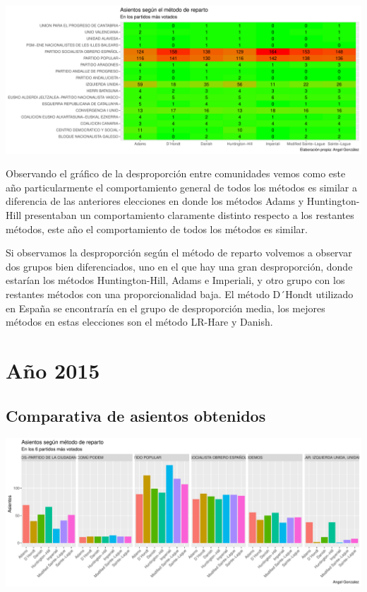 \documentclass[12pt,a4paper,]{book}
\numberwithin{dummy}{section}
\theoremstyle{ocrenumbox}
\theoremstyle{blacknumex}
\theoremstyle{blacknumbox}
\theoremstyle{ocrenum}
\theoremstyle{ocrenum}
\begin{document}
\begin{center}\includegraphics[width=1\linewidth]{figurasR/unnamed-chunk-107-2} \end{center}

Observando el gráfico de la desproporción entre comunidades vemos como
este año particularmente el comportamiento general de todos los métodos
es similar a diferencia de las anteriores elecciones en donde los
métodos Adams y Huntington-Hill presentaban un comportamiento claramente
distinto respecto a los restantes métodos, este año el comportamiento de
todos los métodos es similar.

Si observamos la desproporción según el método de reparto volvemos a
observar dos grupos bien diferenciados, uno en el que hay una gran
desproporción, donde estarían los métodos Huntington-Hill, Adams e
Imperiali, y otro grupo con los restantes métodos con una
proporcionalidad baja. El método D´Hondt utilizado en España se
encontraría en el grupo de desproporción media, los mejores métodos en
estas elecciones son el método LR-Hare y Danish.

\hypertarget{auxf1o-2015}{%
\section{Año 2015}\label{auxf1o-2015}}

\hypertarget{comparativa-de-asientos-obtenidos-11}{%
\subsection{Comparativa de asientos
obtenidos}\label{comparativa-de-asientos-obtenidos-11}}

\begin{center}\includegraphics[width=1\linewidth]{figurasR/unnamed-chunk-109-1} \end{center}
\end{document}
